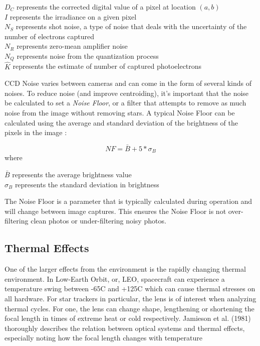 \begin{center}
    $D_C$ represents the corrected digital value of a pixel at location $(a,b)$ \\
    $I$ represents the irradiance on a given pixel \\
    $N_S$ represents shot noise, a type of noise that deals with the uncertainty of the number of electrons captured\\ 
    $N_R$ represents zero-mean amplifier noise \\
    $N_Q$ represents noise from the quantization process \\
    $\hat{K}$ represents the estimate of number of captured photoelectrons
\end{center}
 
\par \qquad CCD Noise varies between cameras and can come in the form of several kinds of noises.
To reduce noise (and improve centroiding), it's important that the noise be calculated to set a \emph{Noise Floor}, or a filter that attempts to remove as much noise from the image without removing stars.
A typical Noise Floor can be calculated using the average and standard deviation of the brightness of the pixels in the image \cite{accuracy_performance_of_star_trackers}:

\begin{equation}
    NF = \bar{B} + 5*\sigma_{B}
\end{equation}
where
\begin{center}
    $\bar{B}$ represents the average brightness value \\
    $\sigma_{B}$ represents the standard deviation in brightness
\end{center}

\par \qquad The Noise Floor is a parameter that is typically calculated during operation and will change between image captures. This ensures the Noise Floor is not over-filtering clean photos or under-filtering noisy photos.

\subsection*{Thermal Effects}
\par \qquad One of the larger effects from the environment is the rapidly changing thermal environment.
In Low-Earth Orbit, or, LEO, spacecraft can experience a temperature swing between -65C and +125C\cite{NASA_LEO_Env} which can cause thermal stresses on all hardware.
For star trackers in particular, the lens is of interest when analyzing thermal cycles.
For one, the lens can change shape, lengthening or shortening the focal length in times of extreme heat or cold respectively. 
Jamieson et al. (1981) thoroughly describes the relation between optical systems and thermal effects, especially noting how the focal length changes with temperature \cite{thermal_effects_in_optical_systems}

